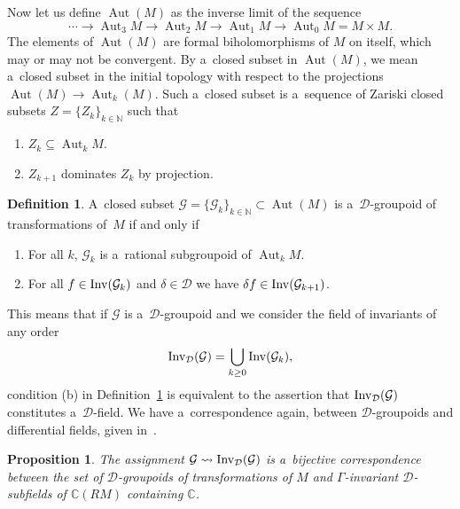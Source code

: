 \documentclass[10pt,a4paper]{amsart}
\numberwithin{equation}{section}
\newtheorem{Proposition}[Theorem]{Proposition}
\theoremstyle{definition}
\newtheorem{Definition}[Theorem]{Definition}
\begin{document}
Now let us define $\operatorname{Aut}(M)$ as the inverse limit of the sequence
\[
\cdots \to \operatorname{Aut}_3M \to \operatorname{Aut}_2M \to \operatorname{Aut}_1M \to \operatorname{Aut}_0M = M\times M.
\]
The elements of $\operatorname{Aut}(M)$ are formal biholomorphisms of $M$ on itself, which may or may not be convergent. By a~closed subset in $\operatorname{Aut}(M)$, we mean a~closed subset in the initial topology with respect to the projections $\operatorname{Aut}(M)\to\operatorname{Aut}_k(M)$. Such a~closed subset is a~sequence of Zariski closed subsets $Z = \{Z_k\}_{k\in \mathbb N}$ such that
\begin{enumerate}\itemsep=0pt
 \item[(a)] $Z_k\subseteq \operatorname{Aut}_kM$.
 \item[(b)] $Z_{k+1}$ dominates $Z_k$ by projection.
\end{enumerate}

\begin{Definition}\label{def_Dgroupoid} A~closed subset $\mathcal G = \{\mathcal G_k\}_{k\in \mathbb N} \subset \operatorname{Aut}(M)$ is a~$\mathcal D$-groupoid of transformations of~$M$ if and only if
\begin{enumerate}\itemsep=0pt
 \item[(a)] For all $k$, $\mathcal G_k$ is a~rational subgroupoid of $\operatorname{Aut}_kM$.
 \item[(b)] For all $f\in {\rm Inv}(\mathcal G_k)$ and $\delta \in \mathcal D$ we have $\delta f \in {\rm Inv}(\mathcal G_{k+1})$.
\end{enumerate}
\end{Definition}

This means that if $\mathcal G$ is a~$\mathcal D$-groupoid and we consider the field of invariants of any order
\[{\rm Inv}_{\mathcal D}(\mathcal G) = \bigcup_{k\geq 0} {\rm Inv}(\mathcal G_k),\]
condition (b) in Definition~\ref{def_Dgroupoid} is equivalent to the assertion that ${\rm Inv}_{\mathcal D}(\mathcal G)$ constitutes a~$\mathcal D$-field. We have a~correspondence again, between $\mathcal D$-groupoids and differential fields, given in~\cite[Proposition~2.16]{bcd2022malgrange}.

\begin{Proposition}
The assignment $\mathcal G \leadsto {\rm Inv}_{\mathcal D}(\mathcal G)$ is a~bijective correspondence between the set of $\mathcal D$-groupoids of transformations of $M$ and $\Gamma$-invariant $\mathcal D$-subfields of $\mathbb C(RM)$ containing $\mathbb C$.
\end{Proposition}
\end{document}
